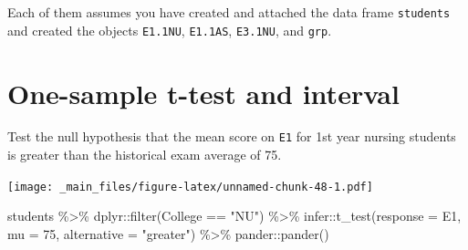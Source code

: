 \documentclass[
]{book}
\newenvironment{Shaded}{\begin{snugshade}}{\end{snugshade}}
\newcommand{\AttributeTok}[1]{\textcolor[rgb]{0.77,0.63,0.00}{#1}}
\newcommand{\DecValTok}[1]{\textcolor[rgb]{0.00,0.00,0.81}{#1}}
\newcommand{\FunctionTok}[1]{\textcolor[rgb]{0.00,0.00,0.00}{#1}}
\newcommand{\NormalTok}[1]{#1}
\newcommand{\SpecialCharTok}[1]{\textcolor[rgb]{0.00,0.00,0.00}{#1}}
\newcommand{\StringTok}[1]{\textcolor[rgb]{0.31,0.60,0.02}{#1}}
\begin{document}
Each of them assumes you have created and attached the data frame \texttt{students} and created the objects \texttt{E1.1NU}, \texttt{E1.1AS}, \texttt{E3.1NU}, and \texttt{grp}.

\hypertarget{one-sample-t-test}{%
\section{One-sample t-test and interval}\label{one-sample-t-test}}

Test the null hypothesis that the mean score on \texttt{E1} for 1st year nursing students is greater than the historical exam average of 75.

\texttt{[image: \_main\_files/figure-latex/unnamed-chunk-48-1.pdf]}

\begin{Shaded}
\begin{Highlighting}[]
\NormalTok{students }\SpecialCharTok{\%\textgreater{}\%} 
\NormalTok{  dplyr}\SpecialCharTok{::}\FunctionTok{filter}\NormalTok{(College }\SpecialCharTok{==} \StringTok{"NU"}\NormalTok{) }\SpecialCharTok{\%\textgreater{}\%} 
\NormalTok{  infer}\SpecialCharTok{::}\FunctionTok{t\_test}\NormalTok{(}\AttributeTok{response =}\NormalTok{ E1, }\AttributeTok{mu =} \DecValTok{75}\NormalTok{, }\AttributeTok{alternative =} \StringTok{"greater"}\NormalTok{) }\SpecialCharTok{\%\textgreater{}\%} 
\NormalTok{  pander}\SpecialCharTok{::}\FunctionTok{pander}\NormalTok{()}
\end{Highlighting}
\end{Shaded}
\end{document}
